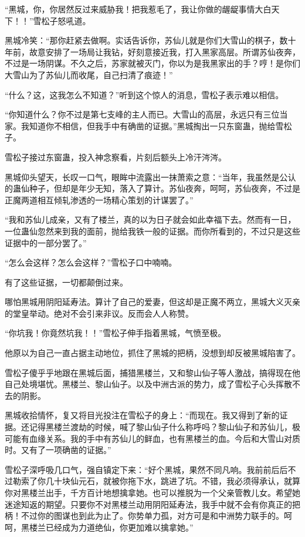 
\begin{this_body}



“黑城，你，你居然反过来威胁我！把我惹毛了，我让你做的龌龊事情大白天下！！”雪松子怒吼道。

黑城冷笑：“那你赶紧去做啊。实话告诉你，苏仙儿就是你们大雪山的棋子，数十年前，故意安排了一场局让我钻，好刻意接近我，打入黑家高层。所谓苏仙夜奔，不过是一场阴谋。不久之后，苏家就被灭门，你以为是我黑家出的手？哼！是你们大雪山为了苏仙儿而收尾，自己扫清了痕迹！”

“什么？这，这我怎么不知道？”听到这个惊人的消息，雪松子表示难以相信。

“你知道什么？你不过是第七支峰的主人而已。大雪山的高层，永远只有三位当家。我知道你不相信，但我手中有确凿的证据。”黑城掏出一只东窗蛊，抛给雪松子。

雪松子接过东窗蛊，投入神念察看，片刻后额头上冷汗涔涔。

黑城仰头望天，长叹一口气，眼眸中流露出一抹萧索之意：“当年，我虽然是公认的蛊仙种子，但却是年少无知，落入了算计。苏仙夜奔，呵呵，苏仙夜奔，不过是正魔两道相互倾轧渗透的一场精心策划的计谋罢了。”

“我和苏仙儿成亲，又有了楼兰，真的以为日子就会如此幸福下去。然而有一日，一位蛊仙忽然来到我的面前，抛给我铁一般的证据。而你所看到的，不过只是这些证据中的一部分罢了。”

“怎么会这样？怎么会这样？”雪松子口中喃喃。

有了这些证据，一切都颠倒过来。

哪怕黑城用阴阳延寿法。算计了自己的爱妻，但这却是正魔不两立，黑城大义灭亲的堂皇举动。绝对不会引来非议。反而会人人称赞。

“你坑我！你竟然坑我！！”雪松子伸手指着黑城，气愤至极。

他原以为自己一直占据主动地位，抓住了黑城的把柄，没想到却反被黑城陷害了。

雪松子傻乎乎地跟在黑城后面，捕猎黑楼兰，又和黎山仙子等人激战，搞得现在他自己处境堪忧。黑楼兰、黎山仙子。以及中洲古派的势力，成了雪松子心头挥散不去的阴影。

黑城收拾情怀，复又将目光投注在雪松子的身上：“而现在。我又得到了新的证据。还记得黑楼兰渡劫的时候，喊了黎山仙子什么称呼吗？黎山仙子和苏仙儿，极可能有血缘关系。我的手中有苏仙儿的鲜血，也有黑楼兰的血。今后和大雪山对质时。又有了一项确凿的证据。”

雪松子深呼吸几口气，强自镇定下来：“好个黑城，果然不同凡响。我前前后后不过勒索了你几十块仙元石，就被你拖下水，跳进了坑。不错，我必须得承认，就算你对黑楼兰出手，千方百计地想擒拿她。也可以推脱为一个父亲管教儿女。希望她迷途知返的期望。只要你不对黑楼兰动用阴阳延寿法，我手中就不会有你真正的把柄！不过你的图谋也到此为止了。你势单力孤，对方可是和中洲势力联手的。呵呵，黑楼兰已经成为力道绝仙，你更加难以擒拿她。”


\end{this_body}
